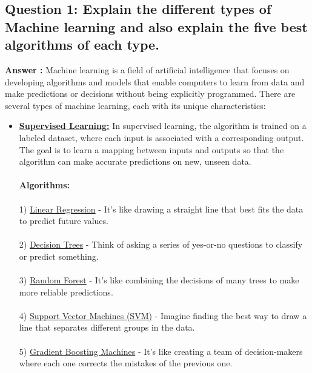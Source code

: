 \documentclass[12pt]{article}
\begin{document}
\subsection*{Question 1: Explain the different types of Machine learning and also explain the five best algorithms of each type.}

\textbf{Answer :}
Machine learning is a field of artificial intelligence that focuses on developing algorithms and models that enable computers to learn from data and make predictions or decisions without being explicitly programmed. There are several types of machine learning, each with its unique characteristics:

\begin{itemize}
    \item  \textbf{\underline{Supervised Learning:}} In supervised learning, the algorithm is trained on a labeled dataset, where each input is associated with a corresponding output. The goal is to learn a mapping between inputs and outputs so that the algorithm can make accurate predictions on new, unseen data.
    \\\\
     \textbf{Algorithms:}
     \\\\
   1) \underline{Linear Regression} - It's like drawing a straight line that best fits the data to predict future values.\\\\
   2) \underline{Decision Trees} - Think of asking a series of yes-or-no questions to classify or predict something.\\\\
   3) \underline{Random Forest} - It's like combining the decisions of many trees to make more reliable predictions.\\\\
   4) \underline{Support Vector Machines (SVM)} -  Imagine finding the best way to draw a line that separates different groups in the data.\\\\
   5) \underline{Gradient Boosting Machines} - It's like creating a team of decision-makers where each one corrects the mistakes of the previous one.\\\\\\\\\\\\


\end{itemize}
\end{document}
